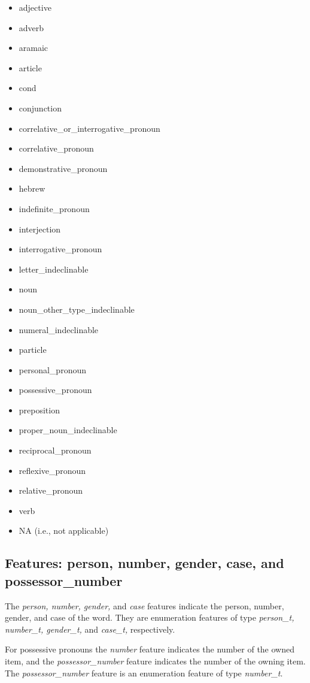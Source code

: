 \documentclass[11pt,oneside,a4paper]{memoir}
\begin{document}
\begin{itemize}
\item adjective
\item adverb
\item aramaic
\item article
\item cond
\item conjunction
\item correlative\_or\_interrogative\_pronoun
\item correlative\_pronoun
\item demonstrative\_pronoun
\item hebrew
\item indefinite\_pronoun
\item interjection
\item interrogative\_pronoun
\item letter\_indeclinable
\item noun
\item noun\_other\_type\_indeclinable
\item numeral\_indeclinable
\item particle
\item personal\_pronoun
\item possessive\_pronoun
\item preposition
\item proper\_noun\_indeclinable
\item reciprocal\_pronoun
\item reflexive\_pronoun
\item relative\_pronoun
\item verb
\item NA (i.e., not applicable)
\end{itemize}

\subsection{Features: person, number, gender, case, and possessor\_number}


The \emph{person, number, gender,} and \emph{case} features indicate the person, number, gender, and
case of the word. They are enumeration features of type \emph{person\_t, number\_t, gender\_t,} and
\emph{case\_t,} respectively.

For possessive pronouns the \emph{number} feature indicates the number of the owned item, and the
\emph{possessor\_number} feature indicates the number of the owning item. The
\emph{possessor\_number} feature is an enumeration feature of type \emph{number\_t}.
\end{document}
